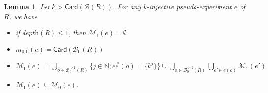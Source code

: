 \documentclass{article}
\theoremstyle{plain}
\newtheorem{lem}[theorem]{Lemma}
\newcommand{\Nat}{\ensuremath{\mathbb{N}}}
\newcommand{\Card}[1]{\textsf{Card}\left( #1 \right)}
\newcommand{\boxes}[1]{\mathcal{B}(#1)}
\newcommand{\boxesatzero}[1]{\mathcal{B}_{0}(#1)}
\newcommand{\boxesatzerogeq}[2]{\mathcal{B}_0^{\geq #2}(#1)}
\begin{document}
\begin{lem}\label{lem: M_1}
Let $k > \Card{\boxes{R}{}}$. 
For any $k$-injective pseudo-experiment $e$ of $R$, we have 
\begin{itemize}
\item if $\textit{depth}(R) \leq 1$, then $\mathcal{M}_1(e) = \emptyset$
\item $m_{0, 0}(e) = \Card{\boxesatzero{R}}$
\item $\mathcal{M}_1(e) = \bigcup_{o \in \boxesatzerogeq{R}{1}} \{ j \in \Nat ; e^\#(o) = \{ k^j \} \} \cup \bigcup_{o \in \boxesatzerogeq{R}{2}} \bigcup_{e' \in e(o)} \mathcal{M}_1(e')$
\item $\mathcal{M}_1(e) \subseteq \mathcal{M}_0(e)$.
\end{itemize}
\end{lem}
\end{document}
